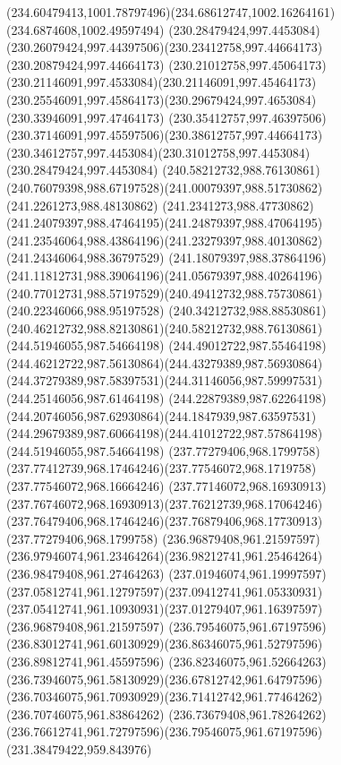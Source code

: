 {{	\curveto(234.60479413,1001.78797496)(234.68612747,1002.16264161)(234.6874608,1002.49597494)
	\moveto(230.28479424,997.4453084)
	\curveto(230.26079424,997.44397506)(230.23412758,997.44664173)(230.20879424,997.44664173)
	\curveto(230.21012758,997.45064173)(230.21146091,997.4533084)(230.21146091,997.45464173)
	\curveto(230.25546091,997.45864173)(230.29679424,997.4653084)(230.33946091,997.47464173)
	\curveto(230.35412757,997.46397506)(230.37146091,997.45597506)(230.38612757,997.44664173)
	\curveto(230.34612757,997.4453084)(230.31012758,997.4453084)(230.28479424,997.4453084)
	\moveto(240.58212732,988.76130861)
	\curveto(240.76079398,988.67197528)(241.00079397,988.51730862)(241.2261273,988.48130862)
	\curveto(241.2341273,988.47730862)(241.24079397,988.47464195)(241.24879397,988.47064195)
	\curveto(241.23546064,988.43864196)(241.23279397,988.40130862)(241.24346064,988.36797529)
	\curveto(241.18079397,988.37864196)(241.11812731,988.39064196)(241.05679397,988.40264196)
	\curveto(240.77012731,988.57197529)(240.49412732,988.75730861)(240.22346066,988.95197528)
	\curveto(240.34212732,988.88530861)(240.46212732,988.82130861)(240.58212732,988.76130861)
	\moveto(244.51946055,987.54664198)
	\curveto(244.49012722,987.55464198)(244.46212722,987.56130864)(244.43279389,987.56930864)
	\curveto(244.37279389,987.58397531)(244.31146056,987.59997531)(244.25146056,987.61464198)
	\curveto(244.22879389,987.62264198)(244.20746056,987.62930864)(244.1847939,987.63597531)
	\curveto(244.29679389,987.60664198)(244.41012722,987.57864198)(244.51946055,987.54664198)
	\moveto(237.77279406,968.1799758)
	\curveto(237.77412739,968.17464246)(237.77546072,968.1719758)(237.77546072,968.16664246)
	\curveto(237.77146072,968.16930913)(237.76746072,968.16930913)(237.76212739,968.17064246)
	\curveto(237.76479406,968.17464246)(237.76879406,968.17730913)(237.77279406,968.1799758)
	\moveto(236.96879408,961.21597597)
	\curveto(236.97946074,961.23464264)(236.98212741,961.25464264)(236.98479408,961.27464263)
	\curveto(237.01946074,961.19997597)(237.05812741,961.12797597)(237.09412741,961.05330931)
	\curveto(237.05412741,961.10930931)(237.01279407,961.16397597)(236.96879408,961.21597597)
	\moveto(236.79546075,961.67197596)
	\curveto(236.83012741,961.60130929)(236.86346075,961.52797596)(236.89812741,961.45597596)
	\curveto(236.82346075,961.52664263)(236.73946075,961.58130929)(236.67812742,961.64797596)
	\curveto(236.70346075,961.70930929)(236.71412742,961.77464262)(236.70746075,961.83864262)
	\curveto(236.73679408,961.78264262)(236.76612741,961.72797596)(236.79546075,961.67197596)
	\moveto(231.38479422,959.843976)
}}
